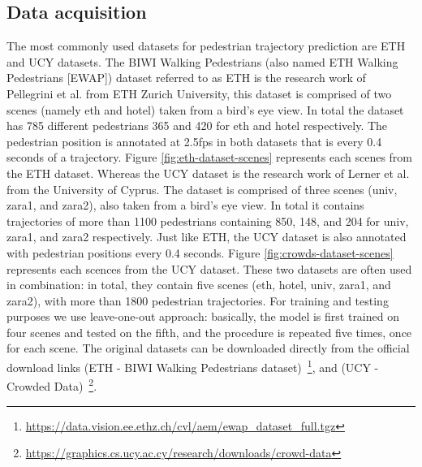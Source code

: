 \subsection{Data acquisition}
The most commonly used datasets for pedestrian trajectory prediction are ETH and UCY datasets.
The BIWI Walking Pedestrians (also named ETH Walking Pedestrians [EWAP]) dataset referred to as ETH \cite[]{ETH-biwi} is the research work of Pellegrini et al. from ETH Zurich University, this dataset is comprised of two scenes (namely eth and hotel) taken from a bird's eye view. In total the dataset has 785 different pedestrians 365 and 420 for eth and hotel respectively. The pedestrian position is annotated at 2.5fps in both datasets that is every 0.4 seconds of a trajectory. Figure \ref{fig:eth-dataset-scenes} represents each scenes from the ETH dataset.\newline
Whereas the UCY dataset \cite[]{UCY-crowds} is the research work of Lerner et al. from the University of Cyprus. The dataset is comprised of three scenes (univ, zara1, and zara2), also taken from a bird's eye view. In total it contains trajectories of more than 1100 pedestrians containing 850, 148, and 204 for univ, zara1, and zara2 respectively. Just like ETH, the UCY dataset is also annotated with pedestrian positions every 0.4 seconds. Figure \ref{fig:crowds-dataset-scenes} represents each scences from the UCY dataset.\newline
These two datasets are often used in combination: in total, they contain five scenes (eth, hotel, univ, zara1, and zara2), with more than 1800 pedestrian trajectories. For training and testing purposes we use leave-one-out approach: basically, the model is first trained on four scenes and tested on the fifth, and the procedure is repeated five times, once for each scene.\newline 
The original datasets can be downloaded directly from the official download links (ETH - BIWI Walking Pedestrians dataset)~\footnote{\label{fn:eth-dataset}\url{https://data.vision.ee.ethz.ch/cvl/aem/ewap_dataset_full.tgz}}, and (UCY - Crowded Data)~\footnote{\label{fn:ucy-dataset}\url{https://graphics.cs.ucy.ac.cy/research/downloads/crowd-data}}.

